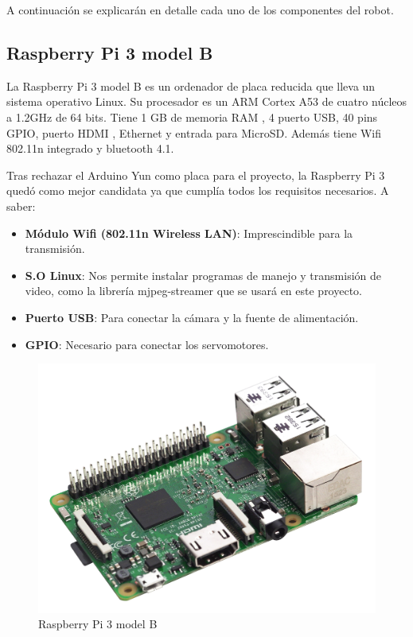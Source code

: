 \documentclass[twoside, 11pt]{epstfg}
\begin{document}
A continuación se explicarán en detalle cada uno de los componentes del robot.

\subsection{Raspberry Pi 3 model B}
La Raspberry Pi 3 model B es un ordenador de placa reducida que lleva un sistema operativo Linux.
Su procesador es un ARM Cortex A53 de cuatro núcleos a 1.2GHz de 64 bits.
Tiene 1 GB de memoria RAM , 4 puerto USB, 40 pins GPIO, puerto HDMI , Ethernet y entrada para MicroSD.
Además tiene Wifi 802.11n integrado y bluetooth 4.1.

Tras rechazar el Arduino Yun como placa para el proyecto, la Raspberry Pi 3 quedó como mejor candidata ya que cumplía todos los requisitos necesarios. A saber:

\begin{itemize}
	\item \textbf{Módulo Wifi (802.11n Wireless LAN)}: Imprescindible para la transmisión.
	\item \textbf{S.O Linux}: Nos permite instalar programas de manejo y transmisión de video, como la librería mjpeg-streamer que se usará en este proyecto.
	\item \textbf{Puerto USB}: Para conectar la cámara y la fuente de alimentación.
	\item \textbf{GPIO}: Necesario para conectar los servomotores.
\end{itemize}


\begin{figure}[H]
	\centerline{
		\mbox{\includegraphics[width=.80\textwidth]{images/raspi3.jpg}}
	}
	\caption{Raspberry Pi 3 model B}
	\label{Raspberry}
	
\end{figure}
\end{document}
